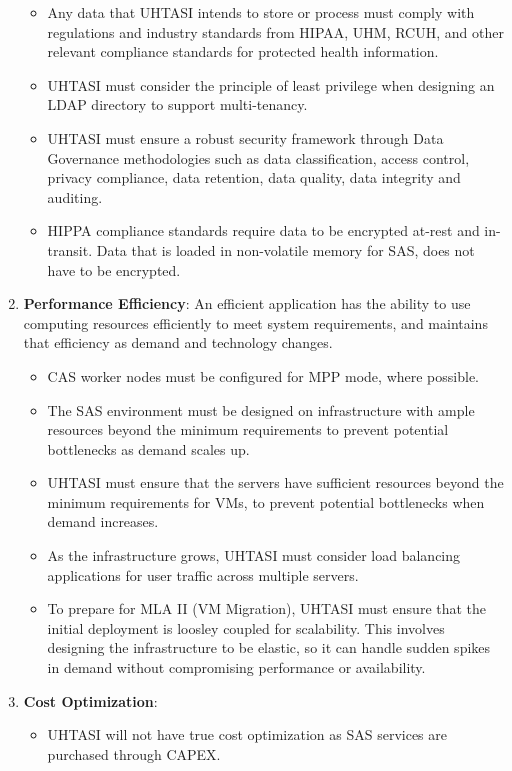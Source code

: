 \begin{enumerate}
\begin{itemize}
        \item Any data that UHTASI intends to store or process must comply with regulations and industry standards from HIPAA, UHM, RCUH, and other relevant compliance standards for protected health information.
        \item UHTASI must consider the principle of least privilege when designing an LDAP directory to support multi-tenancy.
        \item UHTASI must ensure a robust security framework through Data Governance methodologies such as data classification, access control, privacy compliance, data retention, data quality, data integrity and auditing. 
        \item HIPPA compliance standards require data to be encrypted at-rest and in-transit. Data that is loaded in non-volatile memory for SAS, does not have to be encrypted. 
        \end{itemize}
    \item \textbf{\textcolor{Tue-link}{Performance Efficiency}}: An efficient application has the ability to use computing resources efficiently to meet system requirements, and maintains that efficiency as demand and technology changes.
    \begin{itemize}
        \item CAS worker nodes must be configured for MPP mode, where possible. 
        \item The SAS environment must be designed on infrastructure with ample resources beyond the minimum requirements to prevent potential bottlenecks as demand scales up.
        \item UHTASI must ensure that the servers have sufficient resources beyond the minimum requirements for VMs, to prevent potential bottlenecks when demand increases. 
        \item As the infrastructure grows, UHTASI must consider load balancing applications for user traffic across multiple servers. 
        \item To prepare for MLA II (VM Migration), UHTASI must ensure that the initial deployment is loosley coupled for scalability. This involves designing the infrastructure to be elastic, so it can handle sudden spikes in demand without compromising performance or availability.
    \end{itemize}
    \item \textbf{\textcolor{Tue-link}{Cost Optimization}}:
    \begin{itemize}
        \item UHTASI will not have true cost optimization as SAS services are purchased through CAPEX.
    \end{itemize}
\end{enumerate}


